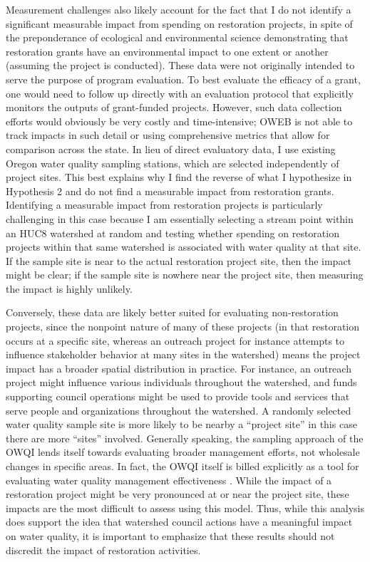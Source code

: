 \documentclass[11pt,a4paper,titlepage]{article}
\begin{document}
Measurement challenges also likely account for the fact that I do not identify a significant measurable impact from spending on restoration projects, in spite of the preponderance of ecological and environmental science demonstrating that restoration grants have an environmental impact to one extent or another (assuming the project is conducted). These data were not originally intended to serve the purpose of program evaluation. To best evaluate the efficacy of a grant, one would need to follow up directly with an evaluation protocol that explicitly monitors the outputs of grant-funded projects. However, such data collection efforts would obviously be very costly and time-intensive; OWEB is not able to track impacts in such detail or using comprehensive metrics that allow for comparison across the state. In lieu of direct evaluatory data, I use existing Oregon water quality sampling stations, which are selected independently of project sites. This best explains why I find the reverse of what I hypothesize in Hypothesis 2 and do not find a measurable impact from restoration grants. Identifying a measurable impact from restoration projects is particularly challenging in this case because I am essentially selecting a stream point within an HUC8 watershed at random and testing whether spending on restoration projects within that same watershed is associated with water quality at that site. If the sample site is near to the actual restoration project site, then the impact might be clear; if the sample site is nowhere near the project site, then measuring the impact is highly unlikely. 

Conversely, these data are likely better suited for evaluating non-restoration projects, since the nonpoint nature of many of these projects (in that restoration occurs at a specific site, whereas an outreach project for instance attempts to influence stakeholder behavior at many sites in the watershed) means the project impact has a broader spatial distribution in practice. For instance, an outreach project might influence various individuals throughout the watershed, and funds supporting council operations might be used to provide tools and services that serve people and organizations throughout the watershed. A randomly selected water quality sample site is more likely to be nearby a “project site” in this case there are more ``sites'' involved. Generally speaking, the sampling approach of the OWQI lends itself towards evaluating broader management efforts, not wholesale changes in specific areas. In fact, the OWQI itself is billed explicitly as a tool for evaluating water quality management effectiveness \parencite{cude2001}. While the impact of a restoration project might be very pronounced at or near the project site, these impacts are the most difficult to assess using this model. Thus, while this analysis does support the idea that watershed council actions have a meaningful impact on water quality, it is important to emphasize that these results should not discredit the impact of restoration activities. 
\end{document}
